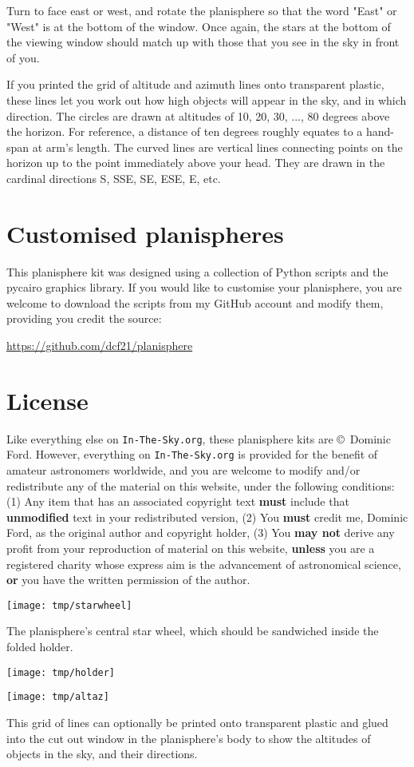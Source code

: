 \documentclass[a4paper,onecolumn,10pt]{article}
\begin{document}
Turn to face east or west, and rotate the planisphere so that the word "East"
or "West" is at the bottom of the window. Once again, the stars at the bottom
of the viewing window should match up with those that you see in the sky in
front of you.

If you printed the grid of altitude and azimuth lines onto transparent plastic,
these lines let you work out how high objects will appear in the sky, and in
which direction. The circles are drawn at altitudes of 10, 20, 30, ..., 80
degrees above the horizon. For reference, a distance of ten degrees roughly
equates to a hand-span at arm's length. The curved lines are vertical lines
connecting points on the horizon up to the point immediately above your head.
They are drawn in the cardinal directions S, SSE, SE, ESE, E, etc.

\section*{Customised planispheres}

This planisphere kit was designed using a collection of Python scripts and the
pycairo graphics library. If you would like to customise your planisphere, you
are welcome to download the scripts from my GitHub account and modify them,
providing you credit the source:

\url{https://github.com/dcf21/planisphere}

\section*{License}

Like everything else on {\tt In-The-Sky.org}, these planisphere kits are
\copyright\ Dominic Ford. However, everything on {\tt In-The-Sky.org} is
provided for the benefit of amateur astronomers worldwide, and you are welcome
to modify and/or redistribute any of the material on this website, under the
following conditions: (1) Any item that has an associated copyright text {\bf
must} include that {\bf unmodified} text in your redistributed version, (2) You
{\bf must} credit me, Dominic Ford, as the original author and copyright
holder, (3) You {\bf may not} derive any profit from your reproduction of
material on this website, {\bf unless} you are a registered charity whose
express aim is the advancement of astronomical science, {\bf or} you have the
written permission of the author.

\newpage

\centerline{\texttt{[image: tmp/starwheel]}}

\vspace{1cm}
The planisphere's central star wheel, which should be sandwiched inside the folded holder.

\newpage
\thispagestyle{empty}
\vspace*{-3.0cm}
\centerline{\texttt{[image: tmp/holder]}}
\newpage

\centerline{\texttt{[image: tmp/altaz]}}

\vspace{1cm}
This grid of lines can optionally be printed onto transparent plastic and glued into the cut out window in the planisphere's body to show the altitudes of objects in the sky, and their directions.
\end{document}
